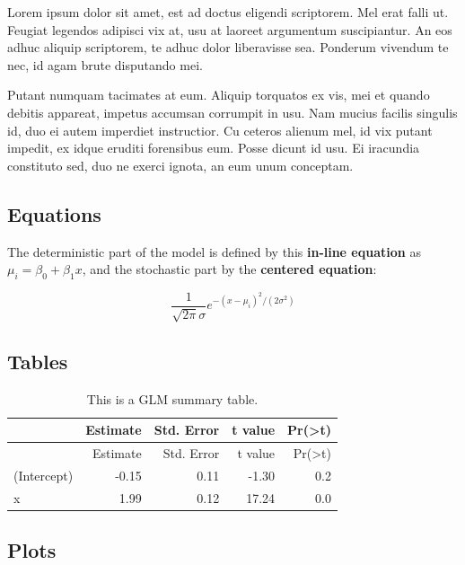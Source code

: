 \documentclass[]{article}
\begin{document}
Lorem ipsum dolor sit amet, est ad doctus eligendi scriptorem. Mel erat
falli ut. Feugiat legendos adipisci vix at, usu at laoreet argumentum
suscipiantur. An eos adhuc aliquip scriptorem, te adhuc dolor
liberavisse sea. Ponderum vivendum te nec, id agam brute disputando mei.

Putant numquam tacimates at eum. Aliquip torquatos ex vis, mei et quando
debitis appareat, impetus accumsan corrumpit in usu. Nam mucius facilis
singulis id, duo ei autem imperdiet instructior. Cu ceteros alienum mel,
id vix putant impedit, ex idque eruditi forensibus eum. Posse dicunt id
usu. Ei iracundia constituto sed, duo ne exerci ignota, an eum unum
conceptam.

\subsection{Equations}\label{equations}

The deterministic part of the model is defined by this \textbf{in-line
equation} as \(\mu_i = \beta_0 + \beta_1x\), and the stochastic part by
the \textbf{centered equation}:

\[ \frac{1}{\sqrt{2\pi}\sigma}e^{-(x-\mu_i)^2/(2\sigma^2)} \]

\subsection{Tables}\label{tables}

\begin{longtable}[c]{@{}lrrrr@{}}
\caption{This is a GLM summary table.}\tabularnewline
\toprule
& Estimate & Std. Error & t value &
Pr(\textgreater{}\textbar{}t\textbar{})\tabularnewline
\midrule
\endfirsthead
\toprule
& Estimate & Std. Error & t value &
Pr(\textgreater{}\textbar{}t\textbar{})\tabularnewline
\midrule
\endhead
(Intercept) & -0.15 & 0.11 & -1.30 & 0.2\tabularnewline
x & 1.99 & 0.12 & 17.24 & 0.0\tabularnewline
\bottomrule
\end{longtable}

\subsection{Plots}\label{plots}
\end{document}
